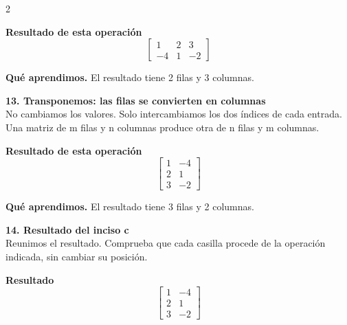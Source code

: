 \documentclass[11pt,a4paper,landscape]{article}
\begin{document}
\begin{multicols*}{2}
\begin{minipage}{\linewidth}
\par\smallskip \textbf{Resultado de esta operación}\[\begin{bmatrix}1 & 2 & 3\\-4 & 1 & -2\end{bmatrix}\]
\par\smallskip\textbf{Qué aprendimos.} El resultado tiene 2 filas y 3 columnas.
\end{minipage}\par\medskip
\noindent\begin{minipage}{\linewidth}\textbf{13. Transponemos: las filas se convierten en columnas}\\[2pt]No cambiamos los valores. Solo intercambiamos los dos índices de cada entrada. Una matriz de m filas y n columnas produce otra de n filas y m columnas.
\par{}\par\smallskip
\par\smallskip \textbf{Resultado de esta operación}\[\begin{bmatrix}1 & -4\\2 & 1\\3 & -2\end{bmatrix}\]
\par\smallskip\textbf{Qué aprendimos.} El resultado tiene 3 filas y 2 columnas.
\end{minipage}\par\medskip
\noindent\begin{minipage}{\linewidth}\textbf{14. Resultado del inciso c}\\[2pt]Reunimos el resultado. Comprueba que cada casilla procede de la operación indicada, sin cambiar su posición.
\par\smallskip \textbf{Resultado}\[\begin{bmatrix}1 & -4\\2 & 1\\3 & -2\end{bmatrix}\]

\end{minipage}
\end{multicols*}
\end{document}
